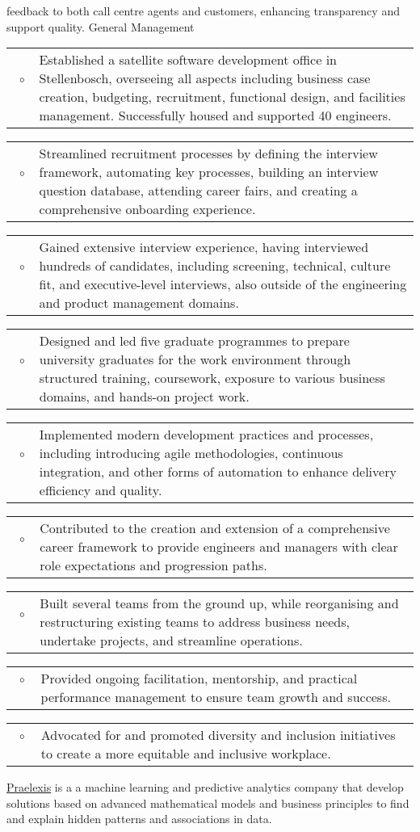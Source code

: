 \documentclass[10pt,a4paper,final]{columncv}
\makeatletter
\newcommand{\cvitembullet}[1]{%
  \begin{tabularx}{\linewidth}{@{}l@{\hspace{0.1em}}X@{}}
    ~$\circ$~ & #1 \\
  \end{tabularx}%
}
\makeatother
\begin{document}
\begin{cvenv}
{{              feedback to both call centre agents and customers, enhancing transparency and support
              quality.}
          General Management
             \cvitembullet{Established a satellite software development office in Stellenbosch, overseeing
              all aspects including business case creation, budgeting, recruitment, functional design, and
              facilities management. Successfully housed and supported 40 engineers.}
             \cvitembullet{Streamlined recruitment processes by defining the interview framework, automating
              key processes, building an interview question database, attending career fairs, and creating
              a comprehensive onboarding experience.}
             \cvitembullet{Gained extensive interview experience, having interviewed hundreds of candidates,
              including screening, technical, culture fit, and executive-level interviews, also outside of
              the engineering and product management domains.}
             \cvitembullet{Designed and led five graduate programmes to prepare university graduates for
              the work environment through structured training, coursework, exposure to various business
              domains, and hands-on project work.}
             \cvitembullet{Implemented modern development practices and processes, including introducing
              agile methodologies, continuous integration, and other forms of automation to enhance delivery
              efficiency and quality.}
             \cvitembullet{Contributed to the creation and extension of a comprehensive career framework
              to provide engineers and managers with clear role expectations and progression paths.}
             \cvitembullet{Built several teams from the ground up, while reorganising and restructuring
              existing teams to address business needs, undertake projects, and streamline operations.}
             \cvitembullet{Provided ongoing facilitation, mentorship, and practical performance management
              to ensure team growth and success.}
             \cvitembullet{Advocated for and promoted diversity and inclusion initiatives to create a more
              equitable and inclusive workplace.}
        }
\end{cvenv}

\pagebreak

\noindent \href{http://www.praelexis.com/}{Praelexis} is a a machine learning and predictive
analytics company that develop solutions based on advanced mathematical models and
business principles to find and explain hidden patterns and associations in data.
\end{document}
